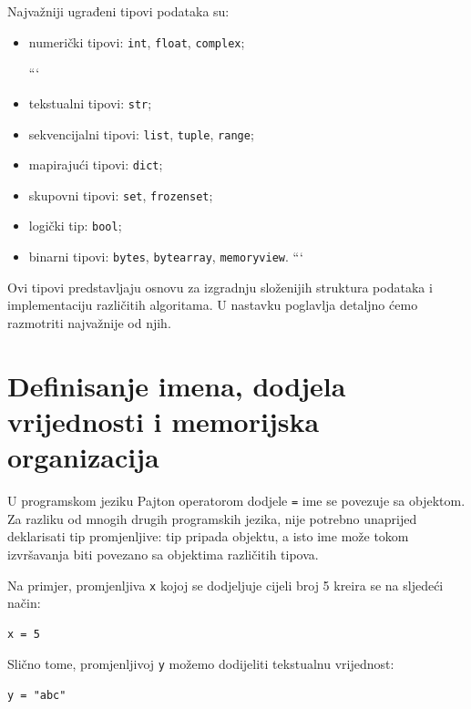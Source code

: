 Najvažniji ugrađeni tipovi podataka su:

\begin{itemize}
	\item numerički tipovi: \texttt{int}, \texttt{float}, \texttt{complex};
	
	```
	\item tekstualni tipovi: \texttt{str};
	
	\item sekvencijalni tipovi: \texttt{list}, \texttt{tuple}, \texttt{range};
	
	\item mapirajući tipovi: \texttt{dict};
	
	\item skupovni tipovi: \texttt{set}, \texttt{frozenset};
	
	\item logički tip: \texttt{bool};
	
	\item binarni tipovi: \texttt{bytes}, \texttt{bytearray}, \texttt{memoryview}.
	```
	
\end{itemize}

Ovi tipovi predstavljaju osnovu za izgradnju složenijih struktura podataka i implementaciju različitih algoritama. U nastavku poglavlja detaljno ćemo razmotriti najvažnije od njih.

\section[Imena i memorijska organizacija]{Definisanje imena, dodjela vrijednosti i memorijska organizacija}

U programskom jeziku Pajton operatorom dodjele \texttt{=} ime se povezuje sa objektom. Za razliku od mnogih drugih programskih jezika, nije potrebno unaprijed deklarisati tip promjenljive: tip pripada objektu, a isto ime može tokom izvršavanja biti povezano sa objektima različitih tipova.

Na primjer, promjenljiva \texttt{x} kojoj se dodjeljuje cijeli broj 5 kreira se na sljedeći način:

\begin{verbatim}
x = 5
\end{verbatim}

Slično tome, promjenljivoj \texttt{y} možemo dodijeliti tekstualnu vrijednost:

\begin{verbatim}
y = "abc"
\end{verbatim}

